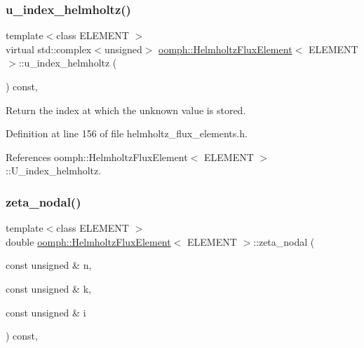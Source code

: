 \mbox{\label{classoomph_1_1HelmholtzFluxElement_ae3fb5779a0337f07a71bf8211ea403e3}} 
\subsubsection{\texorpdfstring{u\+\_\+index\+\_\+helmholtz()}{u\_index\_helmholtz()}}
{\footnotesize\ttfamily template$<$class E\+L\+E\+M\+E\+NT $>$ \\
virtual std\+::complex$<$unsigned$>$ \hyperlink{classoomph_1_1HelmholtzFluxElement}{oomph\+::\+Helmholtz\+Flux\+Element}$<$ E\+L\+E\+M\+E\+NT $>$\+::u\+\_\+index\+\_\+helmholtz (\begin{DoxyParamCaption}{ }\end{DoxyParamCaption}) const\hspace{0.3cm}{\ttfamily [inline]}, {\ttfamily [virtual]}}



Return the index at which the unknown value is stored. 



Definition at line 156 of file helmholtz\+\_\+flux\+\_\+elements.\+h.



References oomph\+::\+Helmholtz\+Flux\+Element$<$ E\+L\+E\+M\+E\+N\+T $>$\+::\+U\+\_\+index\+\_\+helmholtz.

\mbox{\label{classoomph_1_1HelmholtzFluxElement_a02ce0bfabe6ce7ef3901bb4155806d86}} 
\subsubsection{\texorpdfstring{zeta\+\_\+nodal()}{zeta\_nodal()}}
{\footnotesize\ttfamily template$<$class E\+L\+E\+M\+E\+NT $>$ \\
double \hyperlink{classoomph_1_1HelmholtzFluxElement}{oomph\+::\+Helmholtz\+Flux\+Element}$<$ E\+L\+E\+M\+E\+NT $>$\+::zeta\+\_\+nodal (\begin{DoxyParamCaption}\item[{const unsigned \&}]{n,  }\item[{const unsigned \&}]{k,  }\item[{const unsigned \&}]{i }\end{DoxyParamCaption}) const\hspace{0.3cm}{\ttfamily [inline]}, {\ttfamily [virtual]}}



